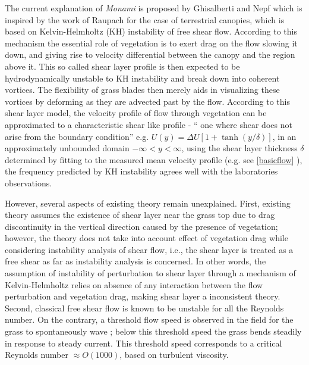\documentclass[12pt]{report}   %
\begin{document}
The current explanation of \textit{Monami} is proposed by Ghisalberti and Nepf \cite{Ghisal02,Nepf00} which is inspired by the work of Raupach for the case of terrestrial canopies, which is based on Kelvin-Helmholtz (KH) instability of free shear flow.
According to this mechanism the essential role of vegetation is to exert drag on the flow slowing it down, and giving rise to velocity differential between the canopy and the region above it. This so called shear layer profile is then expected to be hydrodynamically unstable to KH instability and break down into coherent vortices. The flexibility of grass blades then merely aids in visualizing these vortices by deforming as they are advected past by the flow.
According to this shear layer model, the velocity profile of flow through vegetation can be approximated to a characteristic shear like profile - `` one where shear does not arise from the boundary condition'' e.g. $U(y) = \Delta U[1+\tanh(y/\delta)]$, in an approximately unbounded domain $-\infty < y< \infty$, using the shear layer thickness $\delta$ determined by fitting to the measured mean velocity profile (e.g. see \ref{basicflow} ), the frequency predicted by KH instability agrees well with the laboratories observations.

However, several aspects of existing theory remain unexplained. First, existing theory assumes the existence of shear layer near the grass top due to drag discontinuity in the vertical direction caused by the presence of vegetation; however, the theory does not take into account effect of vegetation drag while considering instability analysis of shear flow, i.e., the shear layer is treated as a free shear as far as instability analysis is concerned. In other words, the assumption of instability of perturbation to shear layer through a mechanism of Kelvin-Helmholtz relies on absence of any interaction between the flow perturbation and vegetation drag, making shear layer a inconsistent theory. Second, classical free shear flow is known to be unstable for all the Reynolds number. On the contrary, a threshold flow speed is observed in the field for the grass to spontaneously wave \cite{Grizzle96}; below this threshold speed the grass bends steadily in response to steady current. This threshold speed corresponds to a  critical Reynolds number $\approx O(1000)$, based on turbulent viscosity. 
 
\end{document}
